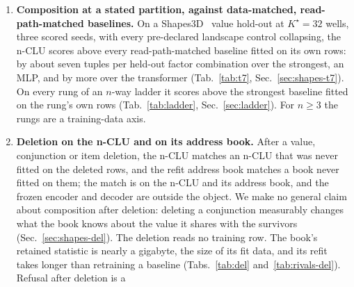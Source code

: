 \documentclass{article} %
\newcommand{\Kstar}{\ensuremath{K^{\star}}}
\begin{document}
\begin{enumerate}
\item \textbf{Composition at a stated partition, against data-matched, read-path-matched baselines.} On a
  Shapes3D~\citep{3dshapes18,kim_disentangling_2019} value hold-out at $\Kstar=32$ wells, three scored seeds, with every %
  pre-declared landscape control collapsing, the n-CLU scores above every read-path-matched baseline
  fitted on its own rows: by about seven tuples %
  per held-out factor combination over the strongest, an MLP, and by more over the transformer %
  (Tab.~\ref{tab:t7}, Sec.~\ref{sec:shapes-t7}). On every rung of an $n$-way ladder it %
  scores above the strongest baseline fitted on the rung's own rows %
  (Tab.~\ref{tab:ladder}, Sec.~\ref{sec:ladder}). For $n\ge3$ the rungs are a training-data axis.
\item \textbf{Deletion on the n-CLU and on its address book.} After
  a value, conjunction or item deletion, the n-CLU matches an n-CLU that was never fitted on the deleted
  rows, and the refit address book matches a book never fitted on them; the match is on the n-CLU and
  its address book, and the frozen encoder and decoder are outside the object. We make no general claim
  about composition after deletion: deleting a conjunction measurably changes what the book knows %
  about the value it shares with the survivors (Sec.~\ref{sec:shapes-del}). The deletion reads no
  training row. The book's retained statistic is nearly a gigabyte, the size of its fit data, and its refit %
  takes longer than retraining a baseline (Tabs.~\ref{tab:del} and~\ref{tab:rivals-del}). Refusal after deletion is a %

\end{enumerate}
\end{document}
